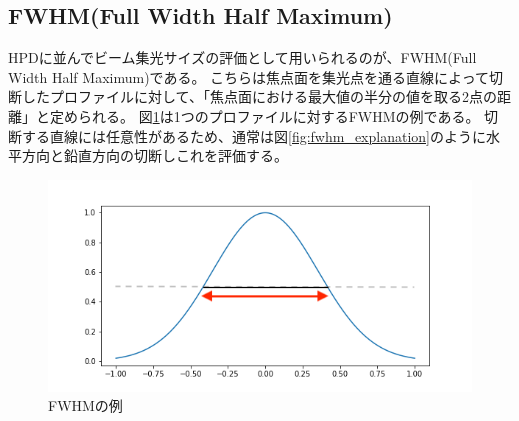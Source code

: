 \documentclass[dvipdfmx,autodetect-engine]{jreport}
\begin{document}
\subsection{FWHM(Full Width Half Maximum)}
HPDに並んでビーム集光サイズの評価として用いられるのが、FWHM(Full Width Half Maximum)である。
こちらは焦点面を集光点を通る直線によって切断したプロファイルに対して、「焦点面における最大値の半分の値を取る2点の距離」と定められる。
図\ref{fig:fwhm_explanation_profile}は1つのプロファイルに対するFWHMの例である。
切断する直線には任意性があるため、通常は図\ref{fig:fwhm_explanation}のように水平方向と鉛直方向の切断しこれを評価する。

\begin{figure}[h]
\centering
\includegraphics[scale=0.6]{images/error_simulation/explanation/fwhm.png}
\caption{FWHMの例}
\label{fig:fwhm_explanation_profile}
\end{figure}
\end{document}
